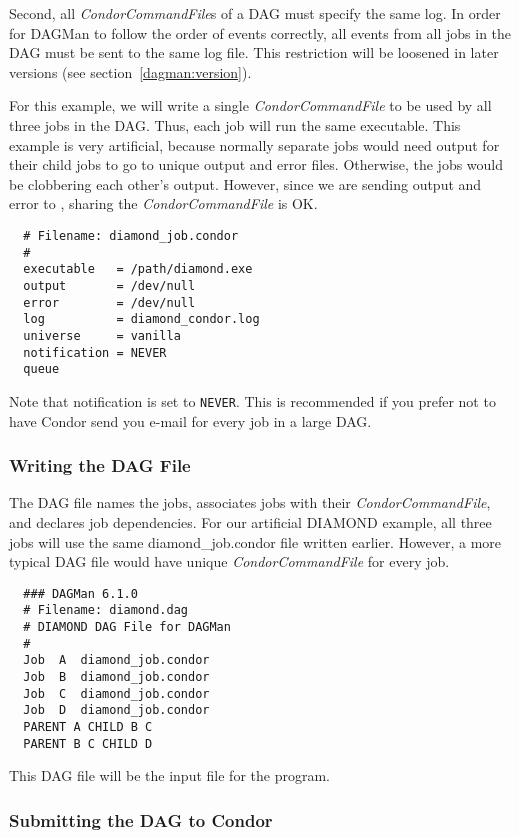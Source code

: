 Second, all \textit{CondorCommandFile}s of a DAG must specify the same log.
In order for DAGMan to follow the order of events correctly, all events from
all jobs in the DAG must be sent to the same log file.  This restriction will
be loosened in later versions (see section~\ref{dagman:version}).

For this example, we will write a single \textit{CondorCommandFile} to be used
by all three jobs in the DAG.  Thus, each job will run the same executable.
This example is very artificial, because normally separate jobs would need
output for their child jobs to go to unique output and error files.
Otherwise, the jobs would be clobbering each other's output.  However, since
we are sending output and error to , sharing the
\textit{CondorCommandFile} is OK.

\begin{verbatim}
  # Filename: diamond_job.condor
  #
  executable   = /path/diamond.exe
  output       = /dev/null
  error        = /dev/null
  log          = diamond_condor.log
  universe     = vanilla
  notification = NEVER
  queue
\end{verbatim}

Note that notification is set to \texttt{NEVER}.  This is recommended if you
prefer not to have Condor send you e-mail for every job in a large DAG.

\subsubsection{Writing the DAG File}
\label{dagman:writedag}

The DAG file names the jobs, associates jobs with their
\textit{CondorCommandFile}, and declares job dependencies.  For our artificial
DIAMOND example, all three jobs will use the same diamond\_job.condor file
written earlier.  However, a more typical DAG file would have unique
\textit{CondorCommandFile} for every job.

\begin{verbatim}
  ### DAGMan 6.1.0
  # Filename: diamond.dag
  # DIAMOND DAG File for DAGMan
  #
  Job  A  diamond_job.condor
  Job  B  diamond_job.condor
  Job  C  diamond_job.condor
  Job  D  diamond_job.condor
  PARENT A CHILD B C
  PARENT B C CHILD D
\end{verbatim}

This DAG file will be the input file for the  program.

\subsubsection{Submitting the DAG to Condor}

